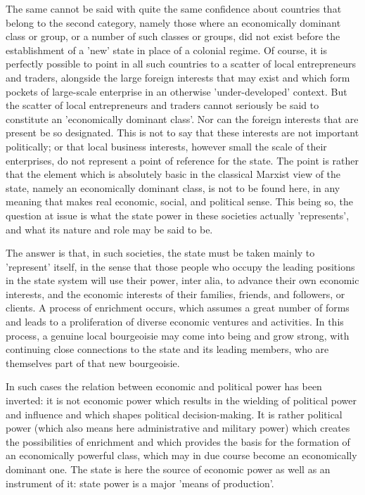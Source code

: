 The same cannot be said with quite the same confidence about countries that belong to the second category, namely those where an economically dominant class or group, or a number of such classes or groups, did not exist before the establishment of a 'new' state in place of a colonial regime. Of course, it is perfectly possible to point in all such countries to a scatter of local entrepreneurs and traders, alongside the large foreign interests that may exist and which form pockets of large-scale enterprise in an otherwise 'under-developed' context. But the scatter of local entrepreneurs and traders cannot seriously be said to constitute an 'economically dominant class'. Nor can the foreign interests that are present be so designated. This is not to say that these interests are not important politically; or that local business interests, however small the scale of their enterprises, do not represent a point of reference for the state. The point is rather that the element which is absolutely basic in the classical Marxist view of the state, namely an economically dominant class, is not to be found here, in any meaning that makes real economic, social, and political sense. This being so, the question at issue is what the state power in these societies actually 'represents', and what its nature and role may be said to be.

The answer is that, in such societies, the state must be taken mainly to 'represent' itself, in the sense that those people who occupy the leading positions in the state system will use their power, inter alia, to advance their own economic interests, and the economic interests of their families, friends, and followers, or clients. A process of enrichment occurs, which assumes a great number of forms and leads to a proliferation of diverse economic ventures and activities. In this process, a genuine local bourgeoisie may come into being and grow strong, with continuing close connections to the state and its leading members, who are themselves part of that new bourgeoisie.

In such cases the relation between economic and political power has been inverted: it is not economic power which results in the wielding of political power and influence and which shapes political decision\hyp{}making. It is rather political power (which also means here administrative and military power) which creates the possibilities of enrichment and which provides the basis for the formation of an economically powerful class, which may in due course become an economically dominant one. The state is here the source of economic power as well as an instrument of it: state power is a major 'means of production'.

